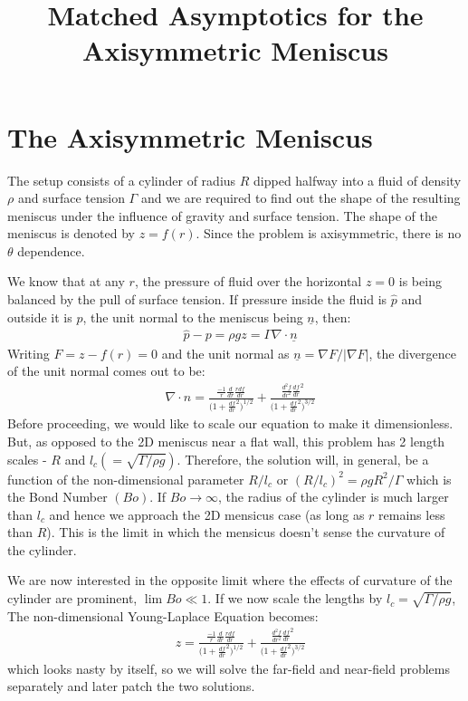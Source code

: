 \documentclass[11pt,a4paper]{article}
\title{Matched Asymptotics for the Axisymmetric Meniscus}
\date{\displaydate{date}}
\author{}
\newcommand{\vect}[1]{\underline{#1}}
\newcommand{\1}{\vect{1}}
\newcommand{\grad}{\nabla}
\begin{document}
\maketitle

\section{The Axisymmetric Meniscus}
The setup consists of a cylinder of radius $R$ dipped halfway into a fluid of density $\rho$ and surface tension $\Gamma$ and we are required to find out the shape of the resulting meniscus under the influence of gravity and surface tension. The shape of the meniscus is denoted by $z=f(r)$. Since the problem is axisymmetric, there is no $\theta$ dependence.

We know that at any $r$, the pressure of fluid over the horizontal $z=0$ is being balanced by the pull of surface tension. If pressure inside the fluid is $\hat p$ and outside it is $p$, the unit normal to the meniscus being $\vect n$, then:
\begin{align*}
&\hat p - p = \rho g z = \Gamma \grad \cdot \vect n
\end{align*}
Writing $F = z-f(r) = 0$ and the unit normal as $\vect n=\grad F/|\grad F|$, the divergence of the unit normal comes out to be:
\begin{align*}
&\grad\cdot n = \frac{\frac{-1}{r}\frac{d}{dr}\frac{rdf}{dr}}{\Big(1+\frac{df}{dr}^2\Big)^{1/2}} + \frac{\frac{d^2f}{dr^2}\frac{df}{dr}^2}{\Big(1+\frac{df}{dr}^2\Big)^{3/2}}
\end{align*}
Before proceeding, we would like to scale our equation to make it dimensionless. But, as opposed to the 2D meniscus near a flat wall, this problem has 2 length scales - $R$ and $l_c(=\sqrt{\Gamma/\rho g})$. Therefore, the solution will, in general, be a function of the non-dimensional parameter $R/l_c$ or $(R/l_c)^2=\rho g R^2/\Gamma$ which is the Bond Number $(Bo)$. If $Bo \to \infty$, the radius of the cylinder is much larger than $l_c$ and hence we approach the 2D mensicus case (as long as $r$ remains less than $R$). This is the limit in which the mensicus doesn't sense the curvature of the cylinder. 

We are now interested in the opposite limit where the effects of curvature of the cylinder are prominent, $\lim Bo \ll 1$. If we now scale the lengths by $l_c = \sqrt{\Gamma/\rho g}$, The non-dimensional Young-Laplace Equation becomes:
\begin{align*}
& z = \frac{\frac{-1}{r}\frac{d}{dr}\frac{rdf}{dr}}{\Big(1+\frac{df}{dr}^2\Big)^{1/2}} + \frac{\frac{d^2f}{dr^2}\frac{df}{dr}^2}{\Big(1+\frac{df}{dr}^2\Big)^{3/2}}
\end{align*}
which looks nasty by itself, so we will solve the far-field and near-field problems separately and later patch the two solutions. 
\end{document}
